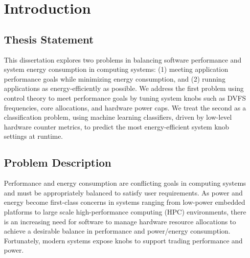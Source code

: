 \chapter{Introduction}
\label{sec:intro}

\section{Thesis Statement}

This dissertation explores two problems in balancing software performance and system energy consumption in computing systems: (1) meeting application performance goals while minimizing energy consumption, and (2) running applications as energy-efficiently as possible.
We address the first problem using control theory to meet performance goals by tuning system knobs such as DVFS frequencies, core allocations, and hardware power caps.
We treat the second as a classification problem, using machine learning classifiers, driven by low-level hardware counter metrics, to predict the most energy-efficient system knob settings at runtime.


\section{Problem Description}
\label{sec:intro-description}

Performance and energy consumption are conflicting goals in computing systems and must be appropriately balanced to satisfy user requirements.
As power and energy become first-class concerns in systems ranging from low-power embedded platforms to large scale high-performance computing (HPC) environments, there is an increasing need for software to manage hardware resource allocations to achieve a desirable balance in performance and power/energy consumption.
Fortunately, modern systems expose knobs to support trading performance and power.

